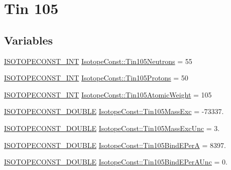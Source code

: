 \hypertarget{group___isotope_const-_tin-_sn105}{}\section{Tin 105}
\label{group___isotope_const-_tin-_sn105}
\subsection*{Variables}
\begin{DoxyCompactItemize}
\item 
\mbox{\hyperlink{group___isotope_const-_macros_ga5f18360b3e99483a35c32d789e62621c}{I\+S\+O\+T\+O\+P\+E\+C\+O\+N\+S\+T\+\_\+\+I\+NT}} \mbox{\hyperlink{group___isotope_const-_tin-_sn105_ga13f760be34891cbbc31855aeeff0ff56}{Isotope\+Const\+::\+Tin105\+Neutrons}} = 55
\item 
\mbox{\hyperlink{group___isotope_const-_macros_ga5f18360b3e99483a35c32d789e62621c}{I\+S\+O\+T\+O\+P\+E\+C\+O\+N\+S\+T\+\_\+\+I\+NT}} \mbox{\hyperlink{group___isotope_const-_tin-_sn105_gabdbac415982d76daafea71b2a85314fc}{Isotope\+Const\+::\+Tin105\+Protons}} = 50
\item 
\mbox{\hyperlink{group___isotope_const-_macros_ga5f18360b3e99483a35c32d789e62621c}{I\+S\+O\+T\+O\+P\+E\+C\+O\+N\+S\+T\+\_\+\+I\+NT}} \mbox{\hyperlink{group___isotope_const-_tin-_sn105_gad4792710956f0849d53c69db53afd316}{Isotope\+Const\+::\+Tin105\+Atomic\+Weight}} = 105
\item 
\mbox{\hyperlink{group___isotope_const-_macros_ga8f45a7272ce02c0b4c65c44636ed719a}{I\+S\+O\+T\+O\+P\+E\+C\+O\+N\+S\+T\+\_\+\+D\+O\+U\+B\+LE}} \mbox{\hyperlink{group___isotope_const-_tin-_sn105_ga1abf199487b0a1979d061f7a2d83ab79}{Isotope\+Const\+::\+Tin105\+Mass\+Exc}} = -\/73337.
\item 
\mbox{\hyperlink{group___isotope_const-_macros_ga8f45a7272ce02c0b4c65c44636ed719a}{I\+S\+O\+T\+O\+P\+E\+C\+O\+N\+S\+T\+\_\+\+D\+O\+U\+B\+LE}} \mbox{\hyperlink{group___isotope_const-_tin-_sn105_gabe4bc987f4bf76a9f16dbc8d35dcee85}{Isotope\+Const\+::\+Tin105\+Mass\+Exc\+Unc}} = 3.
\item 
\mbox{\hyperlink{group___isotope_const-_macros_ga8f45a7272ce02c0b4c65c44636ed719a}{I\+S\+O\+T\+O\+P\+E\+C\+O\+N\+S\+T\+\_\+\+D\+O\+U\+B\+LE}} \mbox{\hyperlink{group___isotope_const-_tin-_sn105_gaa3c137facccc3260f038373ed4c800b5}{Isotope\+Const\+::\+Tin105\+Bind\+E\+PerA}} = 8397.
\item 
\mbox{\hyperlink{group___isotope_const-_macros_ga8f45a7272ce02c0b4c65c44636ed719a}{I\+S\+O\+T\+O\+P\+E\+C\+O\+N\+S\+T\+\_\+\+D\+O\+U\+B\+LE}} \mbox{\hyperlink{group___isotope_const-_tin-_sn105_ga872a43e36bbad2c2ba6cdd0246eefc4a}{Isotope\+Const\+::\+Tin105\+Bind\+E\+Per\+A\+Unc}} = 0.

\end{DoxyCompactItemize}
